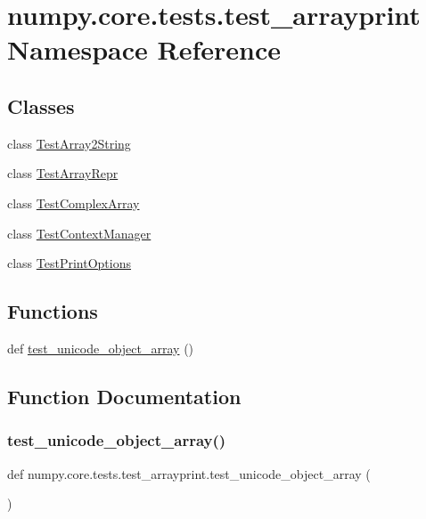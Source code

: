 \hypertarget{namespacenumpy_1_1core_1_1tests_1_1test__arrayprint}{}\section{numpy.\+core.\+tests.\+test\+\_\+arrayprint Namespace Reference}
\label{namespacenumpy_1_1core_1_1tests_1_1test__arrayprint}
\subsection*{Classes}
\begin{DoxyCompactItemize}
\item 
class \hyperlink{classnumpy_1_1core_1_1tests_1_1test__arrayprint_1_1TestArray2String}{Test\+Array2\+String}
\item 
class \hyperlink{classnumpy_1_1core_1_1tests_1_1test__arrayprint_1_1TestArrayRepr}{Test\+Array\+Repr}
\item 
class \hyperlink{classnumpy_1_1core_1_1tests_1_1test__arrayprint_1_1TestComplexArray}{Test\+Complex\+Array}
\item 
class \hyperlink{classnumpy_1_1core_1_1tests_1_1test__arrayprint_1_1TestContextManager}{Test\+Context\+Manager}
\item 
class \hyperlink{classnumpy_1_1core_1_1tests_1_1test__arrayprint_1_1TestPrintOptions}{Test\+Print\+Options}
\end{DoxyCompactItemize}
\subsection*{Functions}
\begin{DoxyCompactItemize}
\item 
def \hyperlink{namespacenumpy_1_1core_1_1tests_1_1test__arrayprint_a38894ff79d431f6c7d381506f88d6497}{test\+\_\+unicode\+\_\+object\+\_\+array} ()
\end{DoxyCompactItemize}


\subsection{Function Documentation}
\mbox{\label{namespacenumpy_1_1core_1_1tests_1_1test__arrayprint_a38894ff79d431f6c7d381506f88d6497}} 
\subsubsection{\texorpdfstring{test\+\_\+unicode\+\_\+object\+\_\+array()}{test\_unicode\_object\_array()}}
{\footnotesize\ttfamily def numpy.\+core.\+tests.\+test\+\_\+arrayprint.\+test\+\_\+unicode\+\_\+object\+\_\+array (\begin{DoxyParamCaption}{ }\end{DoxyParamCaption})}

